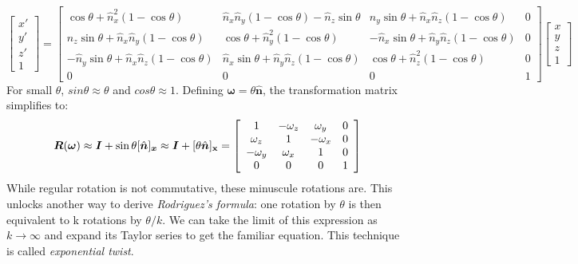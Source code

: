 \documentclass{article}
\begin{document}
\[
\begin{bmatrix}
x' \\
y' \\
z' \\
1
\end{bmatrix}
=
\begin{bmatrix}
\cos \theta + \hat { n } _ { x } ^ { 2 } ( 1 - \cos \theta ) & \hat { n } _ { x } \hat { n } _ { y } ( 1 - \cos \theta ) - \hat { n } _ { z } \sin \theta & \hat { n } _ { y } \sin \theta + \hat { n } _ { x } \hat { n } _ { z } ( 1 - \cos \theta ) & 0 \\
\hat { n } _ { z } \sin \theta + \hat { n } _ { x } \hat { n } _ { y } ( 1 - \cos \theta ) & \cos \theta + \hat { n } _ { y } ^ { 2 } ( 1 - \cos \theta ) & - \hat { n } _ { x } \sin \theta + \hat { n } _ { y } \hat { n } _ { z } ( 1 - \cos \theta ) & 0 \\
- \hat { n } _ { y } \sin \theta + \hat { n } _ { x } \hat { n } _ { z } ( 1 - \cos \theta ) & \hat { n } _ { x } \sin \theta + \hat { n } _ { y } \hat { n } _ { z } ( 1 - \cos \theta ) & \cos \theta + \hat { n } _ { z } ^ { 2 } ( 1 - \cos \theta ) & 0 \\
0 & 0 & 0 & 1
\end{bmatrix}
\begin{bmatrix}
x \\
y \\
z \\
1
\end{bmatrix}
\]
\noident
For small $\theta$, $sin{\theta} \approx \theta$ and $cos{\theta} \approx 1$. Defining $\boldsymbol \omega = \theta \boldsymbol{ \hat n }$, the transformation matrix simplifies to:
\[
\boldsymbol { R } ( \boldsymbol { \omega } ) \approx \boldsymbol { I } + \sin \theta [ \hat { \boldsymbol { n } } ] _ { \boldsymbol { x } } \approx \boldsymbol { I } + [ \theta \hat { \boldsymbol { n } } ] _ { \mathbf { x } } = \left[ \begin{array} { c c c c } { 1 } & { - \omega _ { z } } & { \omega _ { y } } & { 0 } \\ { \omega _ { z } } & { 1 } & { - \omega _ { x } } & { 0 } \\ { - \omega _ { y } } & { \omega _ { x } } & { 1 } & { 0 } \\ { 0 } & { 0 } & { 0 } & { 1 } \end{array} \right]
\]
\noident
While regular rotation is not commutative, these minuscule rotations are. This unlocks another way to derive \textit{Rodriguez’s formula}: one rotation by $\theta$ is then equivalent to k rotations by $\theta / k$. We can take the limit of this expression as $k\to\infty$ and expand its Taylor series to get the familiar equation. This technique is called \textit{exponential twist}.
\end{document}
